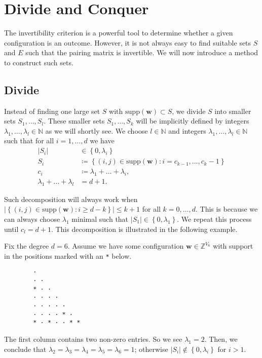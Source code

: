\section{Divide and Conquer}

The invertibility criterion is a powerful tool to determine whether a given configuration is an outcome. However, it is not always easy to find suitable sets \( S \) and \( E \) such that the pairing matrix is invertible. We will now introduce a method to construct such sets.

\subsection*{Divide}

Instead of finding one large set \( S \) with \( \mathrm{supp}(\mathbf w) \subset S \), we divide \( S \) into smaller sets \( S_1, \dots, S_l \). These smaller sets \( S_1, \dots, S_k \) will be implicitly defined by integers \( \lambda_1, \dots, \lambda_l \in \mathbb{N} \) as we will shortly see. We choose \( l \in \mathbb{N} \) and integers \( \lambda_1, \dots, \lambda_l \in \mathbb{N} \) such that for all \( i=1, \dots, d \) we have
\begin{align*}
    \lvert S_i \rvert &\in \left\{ 0, \lambda_i \right\} \\
    S_i &\coloneqq \left\{ (i,j) \in \mathrm{supp}(\mathbf w) : i = c_{k-1}, \dots, c_k - 1 \right\} \\
    c_i &\coloneqq \lambda_1 + \dots + \lambda_i, \\
    \lambda_1 + \dots + \lambda_l &= d+1.
\end{align*}

Such decomposition will always work when \( \lvert \left\{ (i,j) \in \mathrm{supp}(\mathbf{w}) : i \geq d-k \right\} \rvert \leq k+1 \) for all \( k = 0, \dots, d \). This is because we can always choose \( \lambda_1  \) minimal such that \( \lvert S_1 \rvert \in \left\{ 0, \lambda_1 \right\} \). We repeat this process until \( c_l = d+1 \). This decomposition is illustrated in the following example.

\begin{example}\label{ex:decomposition-nsjkfnje}
    Fix the degree \( d=6 \). Assume we have some configuration \( \mathbf w \in \mathbb{Z}^{V_6} \) with support in the positions marked with an \texttt{*} below.
    \begin{verbatim}
        · 
        · · 
        * · · 
        · · · · 
        · · · · · 
        · · · · * · 
        * · * · · * *
    \end{verbatim}
    The first column contains two non-zero entries. So we see \( \lambda_1 = 2 \). Then, we conclude that \( \lambda_2 = \lambda_3 = \lambda_4 = \lambda_5 = \lambda_6 = 1\); otherwise \(     \lvert S_i \rvert \notin \left\{ 0, \lambda_i \right\}     \) for \( i>1 \).
\end{example}


